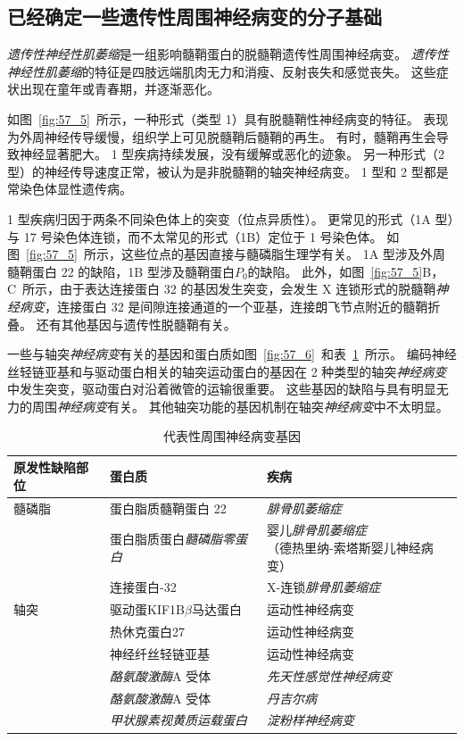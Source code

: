 \subsection{已经确定一些遗传性周围神经病变的分子基础}

\textit{遗传性神经性肌萎缩}是一组影响髓鞘蛋白的脱髓鞘遗传性周围神经病变。
\textit{遗传性神经性肌萎缩}的特征是四肢远端肌肉无力和消瘦、反射丧失和感觉丧失。
这些症状出现在童年或青春期，并逐渐恶化。


如图~\ref{fig:57_5}~所示，一种形式（类型 1）具有脱髓鞘性神经病变的特征。
表现为外周神经传导缓慢，组织学上可见脱髓鞘后髓鞘的再生。
有时，髓鞘再生会导致神经显著肥大。
1 型疾病持续发展，没有缓解或恶化的迹象。
另一种形式（2 型）的神经传导速度正常，被认为是非脱髓鞘的轴突神经病变。
1 型和 2 型都是常染色体显性遗传病。


1 型疾病归因于两条不同染色体上的突变（位点异质性）。
更常见的形式（1A 型）与 17 号染色体连锁，而不太常见的形式（1B）定位于 1 号染色体。
如图~\ref{fig:57_5}~所示，这些位点的基因直接与髓磷脂生理学有关。
1A 型涉及外周髓鞘蛋白 22 的缺陷，1B 型涉及髓鞘蛋白$P_0$的缺陷。
此外，如图~\ref{fig:57_5}B，C~所示，由于表达连接蛋白 32 的基因发生突变，会发生 X 连锁形式的脱髓鞘\textit{神经病变}，连接蛋白 32 是间隙连接通道的一个亚基，连接朗飞节点附近的髓鞘折叠。
还有其他基因与遗传性脱髓鞘有关。


一些与轴突\textit{神经病变}有关的基因和蛋白质如图~\ref{fig:57_6}~和表~\ref{tab:57_3}~所示。
编码神经丝轻链亚基和与驱动蛋白相关的轴突运动蛋白的基因在 2 种类型的轴突\textit{神经病变}中发生突变，驱动蛋白对沿着微管的运输很重要。
这些基因的缺陷与具有明显无力的周围\textit{神经病变}有关。
其他轴突功能的基因机制在轴突\textit{神经病变}中不太明显。



\begin{table}[htbp]
	\caption{代表性周围神经病变基因} \label{tab:57_3} \centering
	\begin{tabular}{lll}
		\toprule
		原发性缺陷部位 & 蛋白质 & 疾病 \\
		\midrule
		髓磷脂 & 蛋白脂质髓鞘蛋白 22 & \textit{腓骨肌萎缩症} \\
		\midrule
		 & 蛋白脂质蛋白\textit{髓磷脂零蛋白} & \makecell{婴儿\textit{腓骨肌萎缩症}\\（德热里纳-索塔斯婴儿神经病变）} \\
		 & 连接蛋白-32 & X-连锁\textit{腓骨肌萎缩症} \\
		轴突 & 驱动蛋KIF1B$\beta$马达蛋白 & 运动性神经病变 \\
		 & 热休克蛋白27 & 运动性神经病变 \\
		 & 神经纤丝轻链亚基 & 运动性神经病变 \\
		 & \textit{酪氨酸激酶}A 受体 & \textit{先天性感觉性神经病变} \\
		 & \textit{酪氨酸激酶}A 受体 & \textit{丹吉尔病} \\
		 & \textit{甲状腺素视黄质运载蛋白} & \textit{淀粉样神经病变} \\
		\bottomrule
	\end{tabular}
\end{table}


